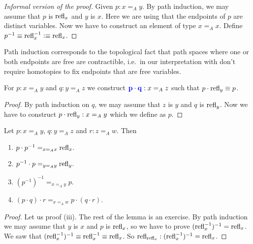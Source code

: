 \begin{proof}[Informal version of the proof]
    Given $p : x \mathrel{=_A} y$.
    By path induction, we may assume that $p$ is $\operatorname{refl}_{x}$ and $y$ is $x$.
    Here we are using that the endpoints of $p$ are distinct variables.
    Now we have to construct an element of type $x \mathrel{=_A} x$.
    Define $p^{-1} \equiv \operatorname{refl}_{x}^{-1} \vcentcolon\equiv \operatorname{refl}_{x}$.
\end{proof}

\begin{rem}
    Path induction corresponds to the topological fact that path spaces where one or both endpoints are free are contractible, i.e.\ in our interpretation with don't require homotopies to fix endpoints that are free variables.
\end{rem}

\begin{boxlem}
    For $p : x \mathrel{=_A} y$ and $q : y \mathrel{=_A} z$ we construct $\alert{p \cdot q} : x \mathrel{=_A} z$ such that $p \cdot\operatorname{refl}_{y} \equiv p$.
\end{boxlem}

\begin{proof}
    By path induction on $q$, we may assume that $z$ is $y$ and $q$ is $\operatorname{refl}_{y}$.
    Now we have to construct $p \cdot\operatorname{refl}_{y} : x \mathrel{=_A} y$ which we define as $p$.
\end{proof}

\begin{boxlem}\label{lem:paths}
    Let $p : x \mathrel{=_A} y$, $q : y \mathrel{=_A} z$ and $r : z \mathrel{=_A} w$.
    Then
    \begin{enumerate}
        \item $p \cdot p^{-1} \mathrel{=_{x \mathrel{=_A} x}} \operatorname{refl}_{x}$.
        \item $p^{-1} \cdot p \mathrel{=_{y \mathrel{=_A} y}} \operatorname{refl}_{y}$.
        \item $(p^{-1})^{-1} \mathrel{=_{x \mathrel{=_A} y}} p$.
        \item $(p \cdot q) \cdot r \mathrel{=_{x \mathrel{=_A} w}} p\cdot (q \cdot r)$.
    \end{enumerate}
\end{boxlem}

\begin{proof}
    Let us proof (iii).
    The rest of the lemma is an exercise.
    By path induction we may assume that $y$ is $x$ and $p$ is $\operatorname{refl}_{x}$, so we have to prove $(\operatorname{refl}_{x}^{-1})^{-1} = \operatorname{refl}_{x}$.
    We saw that $(\operatorname{refl}_{x}^{-1})^{-1} \equiv \operatorname{refl}_{x}^{-1} \equiv \operatorname{refl}_{x}$.
    So $\operatorname{refl}_{\operatorname{refl}_{x}} : (\operatorname{refl}_{x}^{-1})^{-1} = \operatorname{refl}_{x}$.
\end{proof}

